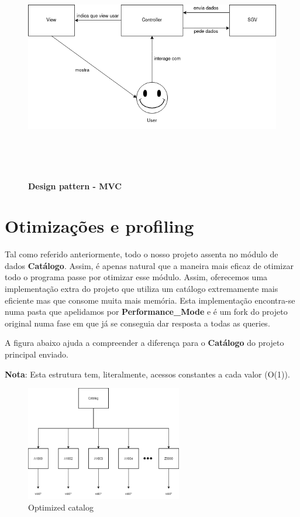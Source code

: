 \documentclass[11pt]{article}
\begin{document}
\vspace{1cm}
\begin{figure}[h]
    \centering
    \includegraphics[width=\textwidth,height=10cm]{images/mvc.png}
    \caption{\textbf{Design pattern - MVC}}
\end{figure}

\newpage
\section{Otimizações e profiling}
Tal como referido anteriormente, todo o nosso projeto assenta no módulo de dados \textbf{Catálogo}. Assim, é apenas natural que a maneira mais eficaz de otimizar todo o programa passe por otimizar esse módulo. Assim, oferecemos uma implementação extra do projeto que utiliza um catálogo extremamente mais eficiente mas que consome muita mais memória. Esta implementação encontra-se numa pasta que apelidamos por \textbf{Performance\_Mode} e é um fork do projeto original numa fase em que já se conseguia dar resposta a todas as queries.

A figura abaixo ajuda a compreender a diferença para o \textbf{Catálogo} do projeto principal enviado.

\textbf{Nota}: Esta estrutura tem, literalmente, acessos constantes a cada valor (O(1)).

\vspace{1cm}
\begin{figure}[h]
    \centering
    \includegraphics[width=\textwidth,height=5cm]{images/catalogPerformance.png}
    \caption{Optimized catalog}
\end{figure}
\end{document}
